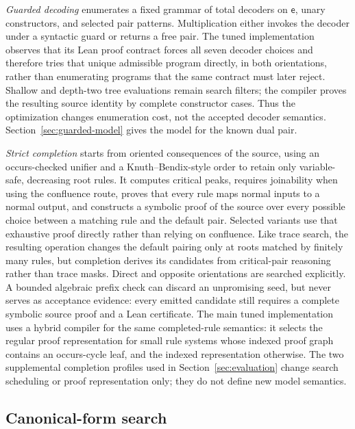 \documentclass[runningheads]{llncs}
\begin{document}
\emph{Guarded decoding} enumerates a fixed grammar of total decoders on
$\mathsf e$, unary constructors, and selected pair patterns.  Multiplication
either invokes the decoder under a syntactic guard or returns a free pair.
The tuned implementation observes that its Lean proof contract forces all
seven decoder choices and therefore tries that unique admissible program
directly, in both orientations, rather than enumerating programs that the same
contract must later reject.  Shallow and depth-two tree evaluations remain
search filters; the compiler proves the resulting source identity by complete
constructor cases.  Thus the optimization changes enumeration cost, not the
accepted decoder semantics.  Section~\ref{sec:guarded-model} gives the model
for the known dual pair.

\emph{Strict completion} starts from oriented consequences of the source,
using an occurs-checked unifier and a Knuth--Bendix-style order to retain only
variable-safe, decreasing root rules.  It computes critical peaks, requires
joinability when using the confluence route, proves that every rule maps normal
inputs to a normal output, and constructs a symbolic proof of the source over
every possible choice between a matching rule and the default pair.  Selected
variants use that exhaustive proof directly rather than relying on confluence.
Like trace search, the resulting operation changes the default pairing only
at roots matched by finitely many rules, but completion derives its candidates
from critical-pair reasoning rather than trace masks.  Direct and opposite
orientations are searched explicitly.  A bounded algebraic prefix check can
discard an unpromising seed, but never serves as acceptance evidence: every
emitted candidate still requires a complete symbolic source proof and a Lean
certificate.  The main tuned implementation uses a hybrid compiler for the
same completed-rule semantics: it selects the regular proof representation for
small rule systems whose indexed proof graph contains an occurs-cycle leaf,
and the indexed representation otherwise.  The two supplemental completion
profiles used in Section~\ref{sec:evaluation} change search scheduling or proof
representation only; they do not define new model semantics.

\subsection{Canonical-form search}
\label{sec:cnf-search}
\end{document}
